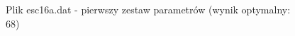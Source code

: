 \documentclass[12pt]{article}
\begin{document}
\begin{figure}
\caption[Podpis_do_spisu]{Plik esc16a.dat - pierwszy zestaw parametrów (wynik optymalny: 68)}
\end{figure}
\end{document}
